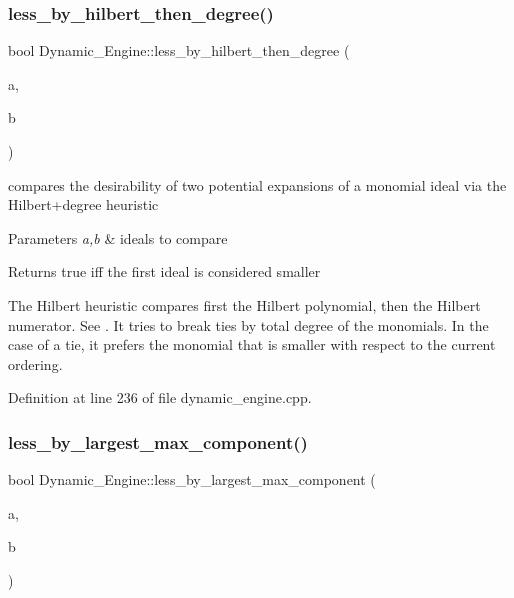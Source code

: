 \subsubsection{\texorpdfstring{less\+\_\+by\+\_\+hilbert\+\_\+then\+\_\+degree()}{less\_by\_hilbert\_then\_degree()}}
{\footnotesize\ttfamily bool Dynamic\+\_\+\+Engine\+::less\+\_\+by\+\_\+hilbert\+\_\+then\+\_\+degree (\begin{DoxyParamCaption}\item[{\hyperlink{group___g_b_computation_class_dynamic___engine_1_1_p_p___with___ideal}{P\+P\+\_\+\+With\+\_\+\+Ideal} \&}]{a,  }\item[{\hyperlink{group___g_b_computation_class_dynamic___engine_1_1_p_p___with___ideal}{P\+P\+\_\+\+With\+\_\+\+Ideal} \&}]{b }\end{DoxyParamCaption})}



compares the desirability of two potential expansions of a monomial ideal via the Hilbert+degree heuristic 


\begin{DoxyParams}{Parameters}
{\em a,b} & ideals to compare \\
\hline
\end{DoxyParams}
\begin{DoxyReturn}{Returns}
{\ttfamily true} iff the first ideal is considered smaller
\end{DoxyReturn}
The Hilbert heuristic compares first the Hilbert polynomial, then the Hilbert numerator. See \cite{CaboaraDynAlg}. It tries to break ties by total degree of the monomials. In the case of a tie, it prefers the monomial that is smaller with respect to the current ordering. 

Definition at line 236 of file dynamic\+\_\+engine.\+cpp.

\mbox{\label{namespace_dynamic___engine_acbc39a829236f4021485cc631f030264}} 
\subsubsection{\texorpdfstring{less\+\_\+by\+\_\+largest\+\_\+max\+\_\+component()}{less\_by\_largest\_max\_component()}}
{\footnotesize\ttfamily bool Dynamic\+\_\+\+Engine\+::less\+\_\+by\+\_\+largest\+\_\+max\+\_\+component (\begin{DoxyParamCaption}\item[{\hyperlink{group___g_b_computation_class_dynamic___engine_1_1_p_p___with___ideal}{P\+P\+\_\+\+With\+\_\+\+Ideal} \&}]{a,  }\item[{\hyperlink{group___g_b_computation_class_dynamic___engine_1_1_p_p___with___ideal}{P\+P\+\_\+\+With\+\_\+\+Ideal} \&}]{b }\end{DoxyParamCaption})}



